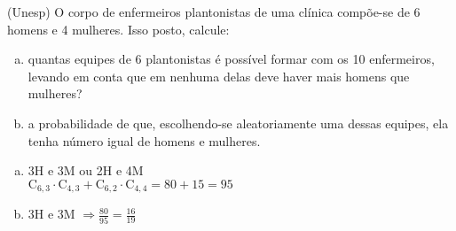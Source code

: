 \begin{ex}
 (Unesp) O corpo de enfermeiros plantonistas de uma clínica compõe-se de 6 homens e 4 mulheres. Isso posto, calcule: 
    \begin{enumerate}[(a)]
    \item quantas equipes de 6 plantonistas é possível formar com os 10 enfermeiros, levando em conta que em nenhuma delas deve haver mais homens que mulheres?
    \item a probabilidade de que, escolhendo-se aleatoriamente uma dessas equipes, ela tenha número igual de homens e mulheres.
    \end{enumerate}
      \begin{sol}
        \phantom{A}
        \begin{enumerate} [(a)]
            \item 3H e 3M ou 2H e 4M \\
            $\mathrm{C}_{6,3}\cdot\mathrm{C}_{4,3}+\mathrm{C}_{6,2}\cdot\mathrm{C}_{4,4}=80+15= 95$
            \item 3H e 3M \hspace{0,4cm} $\Longrightarrow \frac{80}{95}=\frac{16}{19}$
        \end{enumerate}
      \end{sol}
\end{ex}